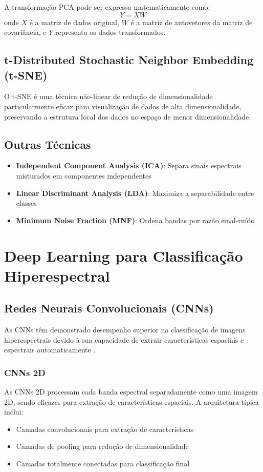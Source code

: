 A transformação PCA pode ser expressa matematicamente como:
\begin{equation}
Y = XW
\end{equation}
onde $X$ é a matriz de dados original, $W$ é a matriz de autovetores da matriz de covariância, e $Y$ representa os dados transformados.

\subsection{t-Distributed Stochastic Neighbor Embedding (t-SNE)}
O t-SNE é uma técnica não-linear de redução de dimensionalidade particularmente eficaz para visualização de dados de alta dimensionalidade, preservando a estrutura local dos dados no espaço de menor dimensionalidade.

\subsection{Outras Técnicas}
\begin{itemize}
    \item \textbf{Independent Component Analysis (ICA)}: Separa sinais espectrais misturados em componentes independentes
    \item \textbf{Linear Discriminant Analysis (LDA)}: Maximiza a separabilidade entre classes
    \item \textbf{Minimum Noise Fraction (MNF)}: Ordena bandas por razão sinal-ruído
\end{itemize}

\section{Deep Learning para Classificação Hiperespectral}\label{sec:deep_learning}

\subsection{Redes Neurais Convolucionais (CNNs)}
As CNNs têm demonstrado desempenho superior na classificação de imagens hiperespectrais devido à sua capacidade de extrair características espaciais e espectrais automaticamente \cite{Lou2024}.

\subsubsection{CNNs 2D}
As CNNs 2D processam cada banda espectral separadamente como uma imagem 2D, sendo eficazes para extração de características espaciais. A arquitetura típica inclui:
\begin{itemize}
    \item Camadas convolucionais para extração de características
    \item Camadas de pooling para redução de dimensionalidade
    \item Camadas totalmente conectadas para classificação final
\end{itemize}

